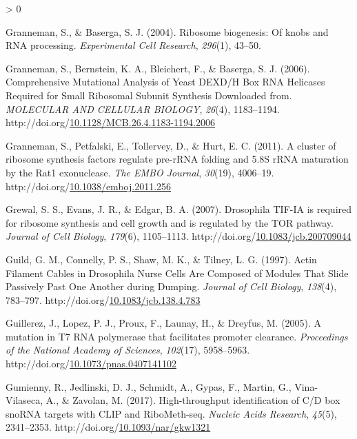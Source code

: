 \documentclass[12pt,oneside]{reedthesis}
\newlength{\cslhangindent}
\newenvironment{CSLReferences}[2] %
 {%
  \setlength{\parindent}{0pt}
  \ifodd #1 \everypar{\setlength{\hangindent}{\cslhangindent}}\ignorespaces\fi
  \ifnum #2 > 0
  \setlength{\parskip}{#2\baselineskip}
  \fi
 }%
 {}
\begin{document}
\begin{CSLReferences}{1}{0}
\leavevmode\hypertarget{ref-Granneman2004a}{}%
Granneman, S., \& Baserga, S. J. (2004). Ribosome biogenesis: Of knobs and {RNA} processing. \emph{Experimental Cell Research}, \emph{296}(1), 43--50.

\leavevmode\hypertarget{ref-Granneman2006}{}%
Granneman, S., Bernstein, K. A., Bleichert, F., \& Baserga, S. J. (2006). Comprehensive {Mutational Analysis} of {Yeast DEXD}/{H Box RNA Helicases Required} for {Small Ribosomal Subunit Synthesis Downloaded} from. \emph{MOLECULAR AND CELLULAR BIOLOGY}, \emph{26}(4), 1183--1194. http://doi.org/\href{https://doi.org/10.1128/MCB.26.4.1183-1194.2006}{10.1128/MCB.26.4.1183-1194.2006}

\leavevmode\hypertarget{ref-Granneman2011}{}%
Granneman, S., Petfalski, E., Tollervey, D., \& Hurt, E. C. (2011). A cluster of ribosome synthesis factors regulate pre-{rRNA} folding and 5.{8S rRNA} maturation by the {Rat1} exonuclease. \emph{The EMBO Journal}, \emph{30}(19), 4006--19. http://doi.org/\href{https://doi.org/10.1038/emboj.2011.256}{10.1038/emboj.2011.256}

\leavevmode\hypertarget{ref-Grewal2007c}{}%
Grewal, S. S., Evans, J. R., \& Edgar, B. A. (2007). Drosophila {TIF-IA} is required for ribosome synthesis and cell growth and is regulated by the {TOR} pathway. \emph{Journal of Cell Biology}, \emph{179}(6), 1105--1113. http://doi.org/\href{https://doi.org/10.1083/jcb.200709044}{10.1083/jcb.200709044}

\leavevmode\hypertarget{ref-guildActinFilamentCables1997}{}%
Guild, G. M., Connelly, P. S., Shaw, M. K., \& Tilney, L. G. (1997). Actin {Filament Cables} in {Drosophila Nurse Cells Are Composed} of {Modules That Slide Passively Past One Another} during {Dumping}. \emph{Journal of Cell Biology}, \emph{138}(4), 783--797. http://doi.org/\href{https://doi.org/10.1083/jcb.138.4.783}{10.1083/jcb.138.4.783}

\leavevmode\hypertarget{ref-guillerezMutationT7RNA2005}{}%
Guillerez, J., Lopez, P. J., Proux, F., Launay, H., \& Dreyfus, M. (2005). A mutation in {T7 RNA} polymerase that facilitates promoter clearance. \emph{Proceedings of the National Academy of Sciences}, \emph{102}(17), 5958--5963. http://doi.org/\href{https://doi.org/10.1073/pnas.0407141102}{10.1073/pnas.0407141102}

\leavevmode\hypertarget{ref-Gumienny2017c}{}%
Gumienny, R., Jedlinski, D. J., Schmidt, A., Gypas, F., Martin, G., Vina-Vilaseca, A., \& Zavolan, M. (2017). High-throughput identification of {C}/{D} box {snoRNA} targets with {CLIP} and {RiboMeth-seq}. \emph{Nucleic Acids Research}, \emph{45}(5), 2341--2353. http://doi.org/\href{https://doi.org/10.1093/nar/gkw1321}{10.1093/nar/gkw1321}


\end{CSLReferences}
\end{document}
